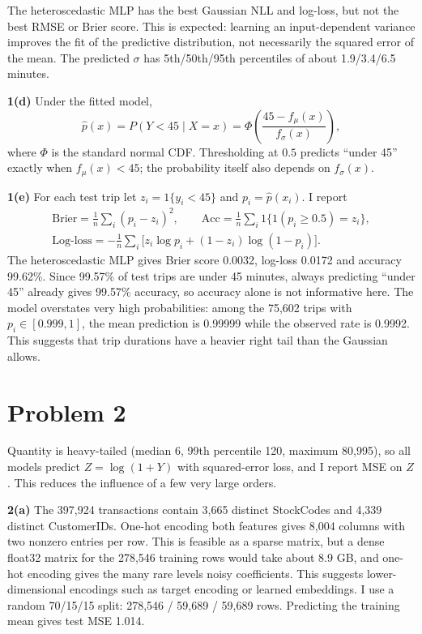 \documentclass[11pt]{article}
\begin{document}
The heteroscedastic MLP has the best Gaussian NLL and log-loss, but not the best RMSE or Brier score. This is expected: learning an input-dependent variance improves the fit of the predictive distribution, not necessarily the squared error of the mean. The predicted $\sigma$ has 5th/50th/95th percentiles of about 1.9/3.4/6.5 minutes.

\textbf{1(d)}
Under the fitted model,
\[
\hat p(x)=P(Y<45\mid X=x)=\Phi\!\left(\frac{45-f_\mu(x)}{f_\sigma(x)}\right),
\]
where $\Phi$ is the standard normal CDF. Thresholding at $0.5$ predicts ``under 45'' exactly when $f_\mu(x)<45$; the probability itself also depends on $f_\sigma(x)$.

\textbf{1(e)}
For each test trip let $z_i=1\{y_i<45\}$ and $p_i=\hat p(x_i)$. I report
\begin{gather*}
\text{Brier}=\frac1n\sum_i(p_i-z_i)^2,\qquad
\text{Acc}=\frac1n\sum_i1\{1(p_i\ge0.5)=z_i\},\\
\text{Log-loss}=-\frac1n\sum_i\big[z_i\log p_i+(1-z_i)\log(1-p_i)\big].
\end{gather*}
The heteroscedastic MLP gives Brier score 0.0032, log-loss 0.0172 and accuracy 99.62\%. Since 99.57\% of test trips are under 45 minutes, always predicting ``under 45'' already gives 99.57\% accuracy, so accuracy alone is not informative here. The model overstates very high probabilities: among the 75,602 trips with $p_i\in[0.999,1]$, the mean prediction is 0.99999 while the observed rate is 0.9992. This suggests that trip durations have a heavier right tail than the Gaussian allows.

\section*{Problem 2}

Quantity is heavy-tailed (median 6, 99th percentile 120, maximum 80,995), so all models predict $Z=\log(1+Y)$ with squared-error loss, and I report MSE on $Z$. This reduces the influence of a few very large orders.

\textbf{2(a)}
The 397,924 transactions contain 3,665 distinct StockCodes and 4,339 distinct CustomerIDs. One-hot encoding both features gives 8,004 columns with two nonzero entries per row. This is feasible as a sparse matrix, but a dense float32 matrix for the 278,546 training rows would take about 8.9 GB, and one-hot encoding gives the many rare levels noisy coefficients. This suggests lower-dimensional encodings such as target encoding or learned embeddings. I use a random 70/15/15 split: 278,546 / 59,689 / 59,689 rows. Predicting the training mean gives test MSE 1.014.
\end{document}
